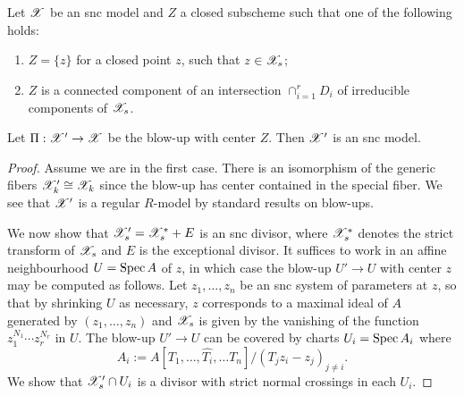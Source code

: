 \begin{prop}\label{lemma:blowupsnc}
    Let $\mathscr{X}$ be an snc model and $Z$ a closed subscheme such that one of the following holds:
    \begin{enumerate}
        \item $Z = \{z\}$ for a closed point $z$, such that $z \in \mathscr{X}_s$;
        \item $Z$ is a connected component of an intersection $\cap_{i = 1}^{r} D_i$ of irreducible components of $\mathscr{X}_s$.
    \end{enumerate}
    Let $\Pi: \mathscr{X}' \to \mathscr{X}$ be the blow-up with center $Z$. Then $\mathscr{X}'$ is an snc model.
\end{prop}
\begin{proof}
    Assume we are in the first case.
    There is an isomorphism of the generic fibers $\mathscr{X}'_k \cong \mathscr{X}_k$ since the blow-up has center contained in the special fiber.
    We see that $\mathscr{X}'$ is a regular $R$-model by standard results on blow-ups. 
    
    We now show that $\mathscr{X}'_s = \mathscr{X}^{*}_s + E$ is an snc divisor, where $\mathscr{X}^{*}_s$ denotes the strict transform of $\mathscr{X}_s$ and $E$ is the exceptional divisor. 
    It suffices to work in an affine neighbourhood $U = \operatorname{Spec} A$ of $z$, in which case the blow-up $U' \to U$ with center $z$ may be computed as follows. 
    Let $z_1, \dots, z_n$ be an snc system of parameters at $z$, so that by shrinking $U$ as necessary, $z$ corresponds to a maximal ideal of $A$ generated by $(z_1, \dots, z_n)$ and $\mathscr{X}_s$ is given by the vanishing of the function $z_1^{N_1} \cdots z_r^{N_r}$ in $U$.
    The blow-up $U' \to U$ can be covered by charts $U_i = {\operatorname{Spec} A_i}$ where 
    \[A_i := A[T_1, \dots, \hat{T_i}, \dots T_n]/(T_j z_i - z_j)_{j \neq i}.\] 
    We show that $\mathscr{X}'_{s} \cap U_i$ is a divisor with strict normal crossings in each $U_i$.
    

\end{proof}
